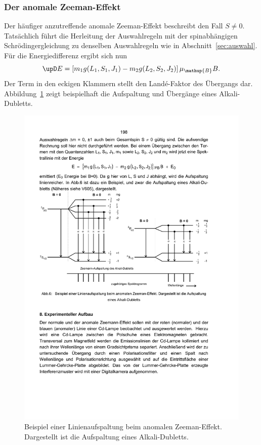 \subsubsection{Der anomale Zeeman-Effekt}
Der häufiger anzutreffende anomale Zeeman-Effekt beschreibt den Fall $S\neq0$.
Tatsächlich führt die Herleitung der Auswahlregeln mit der spinabhängigen
Schrödingergleichung zu denselben Auswahlregeln wie in Abschnitt~\ref{sec:auswahl}.
Für die Energiedifferenz ergibt sich nun
\begin{equation}
    \upD E=\left[m_1g(L_1,S_1,J_1)-m_2g(L_2,S_2,J_2)\right]\mu_{\mathup{B}}B.
    \label{eq:dE_ano}
\end{equation}
Der Term in den eckigen Klammern stellt den Landé-Faktor des Übergangs dar.
Abbildung~\ref{fig:zeeman_anomal} zeigt beispielhaft die Aufspaltung und
Übergänge eines Alkali-Dubletts.
\begin{figure}
    \centering
    \includegraphics[width=\textwidth]{graphics/zeeman_anomal.pdf}
    \caption{Beispiel einer Linienaufspaltung beim anomalen Zeeman-Effekt.
    Dargestellt ist die Aufspaltung eines Alkali-Dubletts.\cite{anleitung}}
    \label{fig:zeeman_anomal}
\end{figure}

